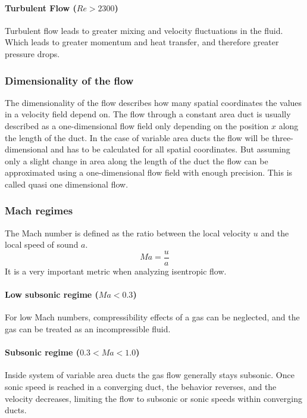 \paragraph{Turbulent Flow (\(Re > 2300\))}

	Turbulent flow leads to greater mixing and velocity fluctuations in the fluid.
	Which leads to greater momentum and heat transfer, and therefore greater pressure drops. 

\subsubsection{Dimensionality of the flow}

	The dimensionality of the flow describes how many spatial coordinates the values in a velocity field depend on.
	The flow through a constant area duct is usually described as a one-dimensional flow field only depending on the position $x$ along the length of the duct.
	In the case of variable area ducts the flow will be three-dimensional and has to be calculated for all spatial coordinates.
	But assuming only a slight change in area along the length of the duct the flow can be approximated using a one-dimensional flow field with enough precision.
	This is called quasi one dimensional flow. \cite{anderson2021modern}

\newpage

\subsubsection{Mach regimes}

	The Mach number is defined as the ratio between the local velocity $u$ and the local speed of sound $a$.
	$$
		Ma = \frac{u}{a}
	$$
	It is a very important metric when analyzing isentropic flow.

\paragraph{Low subsonic regime (\(Ma < 0.3\))}

	For low Mach numbers, compressibility effects of a gas can be neglected, and the gas can be treated as an incompressible fluid.
\paragraph{Subsonic regime (\(0.3 < Ma < 1.0\))} 

	Inside system of variable area ducts the gas flow generally stays subsonic.
	Once sonic speed is reached in a converging duct, the behavior reverses, and the velocity decreases, limiting the flow to subsonic or sonic speeds within converging ducts.\\
	
